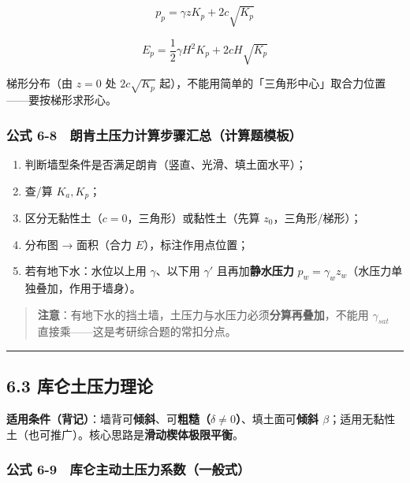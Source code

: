 \documentclass[
]{article}
\providecommand{\tightlist}{%
  \setlength{\itemsep}{0pt}\setlength{\parskip}{0pt}}
\begin{document}
\[p_p=\gamma zK_p+2c\sqrt{K_p}\]

\[E_p=\frac{1}{2}\gamma H^2K_p+2cH\sqrt{K_p}\]

梯形分布（由 \(z=0\) 处 \(2c\sqrt{K_p}\)
起），不能用简单的「三角形中心」取合力位置------要按梯形求形心。

\subsubsection{公式
6-8　朗肯土压力计算步骤汇总（计算题模板）}\label{ux516cux5f0f-6-8-ux6717ux80afux571fux538bux529bux8ba1ux7b97ux6b65ux9aa4ux6c47ux603bux8ba1ux7b97ux9898ux6a21ux677f}

\begin{enumerate}
\def\labelenumi{\arabic{enumi}.}
\tightlist
\item
  判断墙型条件是否满足朗肯（竖直、光滑、填土面水平）；
\item
  查/算 \(K_a,K_p\)；
\item
  区分无黏性土（\(c=0\)，三角形）或黏性土（先算 \(z_0\)，三角形/梯形）；
\item
  分布图 → 面积（合力 \(E\)），标注作用点位置；
\item
  若有地下水：水位以上用 \(\gamma\)、以下用 \(\gamma'\)
  且再加\textbf{静水压力}
  \(p_w=\gamma_w z_w\)（水压力单独叠加，作用于墙身）。
\end{enumerate}

\begin{quote}
\textbf{注意}：有地下水的挡土墙，土压力与水压力必须\textbf{分算再叠加}，不能用
\(\gamma_{sat}\) 直接乘------这是考研综合题的常扣分点。
\end{quote}

\begin{center}\rule{0.5\linewidth}{0.5pt}\end{center}

\subsection{6.3
库仑土压力理论}\label{ux5e93ux4ed1ux571fux538bux529bux7406ux8bba}

\textbf{适用条件（背记）}：墙背可\textbf{倾斜}、可\textbf{粗糙（\(\delta\ne0\)）}、填土面可\textbf{倾斜
\(\beta\)}；适用无黏性土（也可推广）。核心思路是\textbf{滑动楔体极限平衡}。

\subsubsection{公式
6-9　库仑主动土压力系数（一般式）}\label{ux516cux5f0f-6-9-ux5e93ux4ed1ux4e3bux52a8ux571fux538bux529bux7cfbux6570ux4e00ux822cux5f0f}
\end{document}
